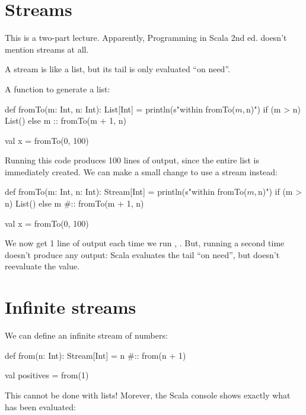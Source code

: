 \newlecture

\section{Streams}

\begin{instructor}
This is a two-part lecture.
Apparently, Programming in Scala 2nd ed. doesn't mention streams at all. 
\end{instructor}


A stream is like a list, but its tail is only evaluated ``on need''.

A function to generate a list:

\begin{scalacode}
def fromTo(m: Int, n: Int): List[Int] = {
  println(s"within fromTo($m, $n)")
  if (m > n) {
    List()
  }
  else {
    m :: fromTo(m + 1, n)
  }
}

val x = fromTo(0, 100)
\end{scalacode}

Running this code produces 100 lines of output, since the entire list is
immediately created. We can make a small change to use a stream instead:

\begin{scalacode}
def fromTo(m: Int, n: Int): Stream[Int] = {
  println(s"within fromTo($m, $n)")
  if (m > n) {
    List()
  }
  else {
    m #:: fromTo(m + 1, n)
  }
}

val x = fromTo(0, 100)
\end{scalacode}

We now get 1 line of output each time we run , .
But, running  a second time doesn't produce any output: Scala evaluates
the tail ``on need'', but doesn't reevaluate the value.

\section{Infinite streams}

We can define an infinite stream of numbers:

\begin{scalacode}
def from(n: Int): Stream[Int] = n #:: from(n + 1)

val positives = from(1)
\end{scalacode}

This cannot be done with lists! Morever, the Scala console shows exactly what has
been evaluated:


